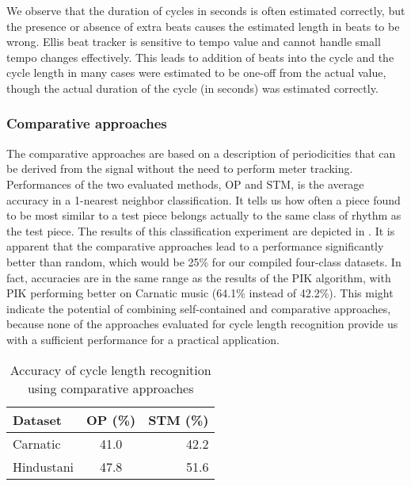 We observe that the duration of cycles in seconds is often estimated correctly, but the presence or absence of extra beats causes the estimated length in beats to be wrong. Ellis beat tracker is sensitive to tempo value and cannot handle small tempo changes effectively. This leads to addition of beats into the cycle and the cycle length in many cases were estimated to be one-off from the actual value, though the actual duration of the cycle (in seconds) was estimated correctly. 
%
\subsubsection{Comparative approaches}
The comparative approaches are based on a description of periodicities that can be derived from the signal without the need to perform meter tracking. Performances of the two evaluated methods, \acrshort{OP} and \acrshort{STM}, is the average accuracy in a 1-nearest neighbor classification. It tells us how often a piece found to be most similar to a test piece belongs actually to the same class of rhythm as the test piece. The results of this classification experiment are depicted in . It is apparent that the comparative approaches lead to a performance significantly better than random, which would be 25\% for our compiled four-class datasets. In fact, accuracies are in the same range as the results of the \acrshort{PIK} algorithm, with \acrshort{PIK} performing better on Carnatic music (64.1\% instead of 42.2\%). This might indicate the potential of combining self-contained and comparative approaches, because none of the approaches evaluated for cycle length recognition provide us with a sufficient performance for a practical application. 
\begin{table}
\centering
\begin{tabular}{@{}lcr@{}} \toprule
Dataset & \acrshort{OP} (\%)  & \acrshort{STM} (\%) \tabularnewline \midrule
Carnatic & 41.0  & 42.2    \tabularnewline 
Hindustani & 47.8  & 51.6   \tabularnewline \bottomrule
\end{tabular}
\caption{Accuracy of cycle length recognition using comparative approaches}\label{tab:jnmreval:cycleCOMP} 
\end{table}